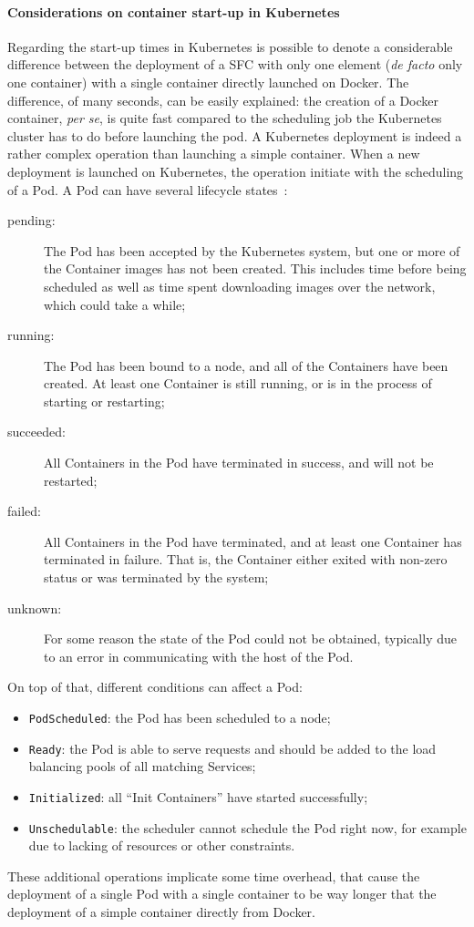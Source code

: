 \paragraph*{Considerations on container start-up in Kubernetes}
Regarding the start-up times in Kubernetes is possible to denote a considerable
difference between the deployment of a SFC with only one element
(\textit{de facto} only one container) with a single container directly launched
on Docker. The difference, of many seconds, can be easily explained: the
creation of a Docker container, \textit{per se}, is quite fast compared to the
scheduling job the Kubernetes cluster has to do before launching the pod. A
Kubernetes deployment is indeed a rather complex operation than launching a
simple container. When a new deployment is launched on Kubernetes, the operation
initiate with the scheduling of a Pod. A Pod can have several lifecycle
states~\cite{kubePodLifecycle}:
\begin{description}
\item[pending:] The Pod has been accepted by the Kubernetes system, but one or
  more of the Container images has not been created. This includes time before
  being scheduled as well as time spent downloading images over the network,
  which could take a while;
\item[running:] The Pod has been bound to a node, and all of the Containers have
  been created. At least one Container is still running, or is in the process of
  starting or restarting;
\item[succeeded:] All Containers in the Pod have terminated in success, and will
  not be restarted;
\item[failed:] All Containers in the Pod have terminated, and at least one
  Container has terminated in failure. That is, the Container either exited with
  non-zero status or was terminated by the system;
\item[unknown:] For some reason the state of the Pod could not be obtained,
  typically due to an error in communicating with the host of the Pod.
\end{description}

On top of that, different conditions can affect a Pod:
\begin{itemize}
\item \verb!PodScheduled!: the Pod has been scheduled to a node;
\item \verb!Ready!: the Pod is able to serve requests and should be added to the
  load balancing pools of all matching Services;
\item \verb!Initialized!: all ``Init Containers'' have started successfully;
\item \verb!Unschedulable!: the scheduler cannot schedule the Pod right now, for
  example due to lacking of resources or other constraints.
\end{itemize}

These additional operations implicate some time overhead, that cause the
deployment of a single Pod with a single container to be way longer that the
deployment of a simple container directly from Docker.
